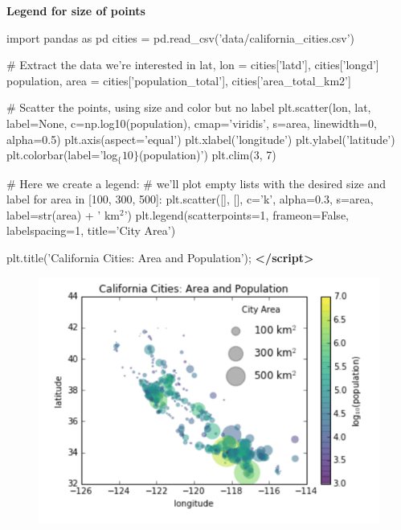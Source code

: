 \documentclass[]{book}
\newenvironment{Shaded}{\begin{snugshade}}{\end{snugshade}}
\newcommand{\KeywordTok}[1]{\textcolor[rgb]{0.13,0.29,0.53}{\textbf{#1}}}
\newcommand{\NormalTok}[1]{#1}
\theoremstyle{definition}
\theoremstyle{definition}
\theoremstyle{definition}
\theoremstyle{remark}
\begin{document}
\textbf{Legend for size of points}

\begin{Shaded}
\begin{Highlighting}[]
\NormalTok{import pandas as pd}
\NormalTok{cities = pd.read_csv('data/california_cities.csv')}

\NormalTok{# Extract the data we're interested in}
\NormalTok{lat, lon = cities['latd'], cities['longd']}
\NormalTok{population, area = cities['population_total'], cities['area_total_km2']}

\NormalTok{# Scatter the points, using size and color but no label}
\NormalTok{plt.scatter(lon, lat, label=None,}
\NormalTok{            c=np.log10(population), cmap='viridis',}
\NormalTok{            s=area, linewidth=0, alpha=0.5)}
\NormalTok{plt.axis(aspect='equal')}
\NormalTok{plt.xlabel('longitude')}
\NormalTok{plt.ylabel('latitude')}
\NormalTok{plt.colorbar(label='log$_\{10\}$(population)')}
\NormalTok{plt.clim(3, 7)}

\NormalTok{# Here we create a legend:}
\NormalTok{# we'll plot empty lists with the desired size and label}
\NormalTok{for area in [100, 300, 500]:}
\NormalTok{    plt.scatter([], [], c='k', alpha=0.3, s=area,}
\NormalTok{                label=str(area) + ' km$^2$')}
\NormalTok{plt.legend(scatterpoints=1, frameon=False, labelspacing=1, title='City Area')}

\NormalTok{plt.title('California Cities: Area and Population');}
\KeywordTok{</script>}
\end{Highlighting}
\end{Shaded}

\begin{figure}
\centering
\includegraphics{images/legend4.png}
\caption{}
\end{figure}
\end{document}
